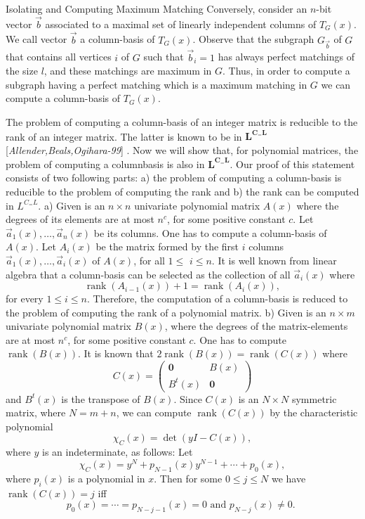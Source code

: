 \documentclass{beamer}
\begin{document}
\begin{frame}[allowframebreaks]{Isolating and Computing Maximum Matching}
	Conversely, consider an $n$-bit vector $\vec{b}$ associated to a maximal set of linearly independent columns of $T_G(x)$. We call vector $\vec{b}$ a column-basis of $T_G(x)$. Observe that the subgraph $G_{\vec{b}}$ of $G$ that contains all vertices $i$ of $G$ such that $\vec{b}_i=1$ has always perfect matchings of the size $l$, and these matchings are maximum in $G$. Thus, in order to compute a subgraph having a perfect matching which is a maximum matching in $G$ we can compute a column-basis of $T_G(x)$.
	
	The problem of computing a column-basis of an integer matrix  is reducible to the rank of an integer matrix. The latter is known to be in $\mathbf{L}^{\mathbf{C}_{=} \mathbf{L}}$[\textit{Allender,Beals,Ogihara-99}] . Now we will show that, for polynomial matrices,  the problem of computing a columnbasis is also in $\mathbf{L}^{\mathbf{C}_=\mathbf{L}} $. Our proof of this statement consists of two following parts: a) the problem of 
	computing a column-basis is reducible to the problem of computing the rank and b) the rank can be computed in $L^{C_=L}$.
	a) Given is an $n \times n$ univariate polynomial matrix $A(x)$ where the degrees of its elements are at most $n^c$, for some positive constant $c$. Let $\vec{a}_1(x), \ldots, \vec{a}_n(x)$ be its columns. One has to compute a column-basis of $A(x)$.
	Let $A_i(x)$ be the matrix formed by the first $i$ columns $\vec{a}_1(x), \ldots, \vec{a}_i(x)$ of $A(x)$, for all $1 \leq$ $i \leq n$. It is well known from linear algebra that a column-basis can be selected as the collection of all $\vec{a}_i(x)$ where
	$$
	\operatorname{rank}\left(A_{i-1}(x)\right)+1=\operatorname{rank}\left(A_i(x)\right),
	$$
	for every $1 \leq i \leq n$. Therefore, the computation of a column-basis is reduced to the problem of computing the rank of a polynomial matrix.
	b) Given is an $n \times m$ univariate polynomial matrix $B(x)$, where the degrees of the matrix-elements are at most $n^c$, for some positive constant $c$. One has to compute $\operatorname{rank}(B(x))$.
	It is known that $2 \operatorname{rank}(B(x))=\operatorname{rank}(C(x))$ where
	$$
	C(x)=\left(\begin{array}{cc}
		\mathbf{0} & B(x) \\
		B^t(x) & \mathbf{0}
	\end{array}\right)
	$$
	and $B^t(x)$ is the transpose of $B(x)$. Since $C(x)$ is an $N \times N$ symmetric matrix, where $N=m+n$, we can compute $\operatorname{rank}(C(x))$ by the characteristic polynomial
	$$
	\chi_C(x)=\operatorname{det}(y I-C(x)),
	$$
	where $y$ is an indeterminate, as follows: Let
	$$
	\chi_C(x)=y^N+p_{N-1}(x) y^{N-1}+\cdots+p_0(x),
	$$
	where $p_i(x)$ is a polynomial in $x$. Then for some $0 \leq j \leq N$ we have $\operatorname{rank}(C(x))=j$ iff
	$$
	p_0(x)=\cdots=p_{N-j-1}(x)=0 \text { and } p_{N-j}(x) \neq 0 \text {. }
	$$
	

\end{frame}
\end{document}
